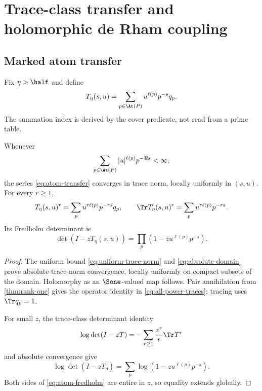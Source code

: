 \section{Trace-class transfer and holomorphic de Rham coupling}
\label{sec:holomorphic}

\subsection{Marked atom transfer}

Fix \(\eta>\half\) and define
\begin{equation}
T_\eta(s,u)
=\sum_{p\in\At(P)}u^{\ell(p)}p^{-s}q_p.
\label{eq:atom-transfer}
\end{equation}
The summation index is derived by the cover predicate, not read from a prime
table.

\begin{theorem}
\label{thm:trace-class-transfer}
Whenever
\begin{equation}
\sum_{p\in\At(P)}
|u|^{\ell(p)}p^{-\Re s}<\infty,
\label{eq:absolute-domain}
\end{equation}
the series \eqref{eq:atom-transfer} converges in trace norm, locally uniformly
in \((s,u)\). For every \(r\ge1\),
\begin{equation}
T_\eta(s,u)^r
=\sum_p u^{r\ell(p)}p^{-rs}q_p,
\qquad
\Tr T_\eta(s,u)^r
=\sum_p u^{r\ell(p)}p^{-rs}.
\label{eq:all-power-traces}
\end{equation}
Its Fredholm determinant is
\begin{equation}
\det(I-zT_\eta(s,u))
=\prod_p \left(1-zu^{\ell(p)}p^{-s}\right).
\label{eq:atom-fredholm}
\end{equation}
\end{theorem}

\begin{proof}
The uniform bound \eqref{eq:uniform-trace-norm} and
\eqref{eq:absolute-domain} prove absolute trace-norm convergence, locally
uniformly on compact subsets of the domain. Holomorphy as an
\(\Sone\)-valued map follows. Pair annihilation from
\cref{thm:rank-one} gives the operator identity in
\eqref{eq:all-power-traces}; tracing uses \(\Tr q_p=1\).

For small \(z\), the trace-class determinant identity
\[
\log\det(I-zT)
=-\sum_{r\ge1}\frac{z^r}{r}\Tr T^r
\]
and absolute convergence give
\[
\log\det(I-zT_\eta)
=\sum_p \log\left(1-zu^{\ell(p)}p^{-s}\right).
\]
Both sides of \eqref{eq:atom-fredholm} are entire in \(z\), so equality
extends globally.
\end{proof}

